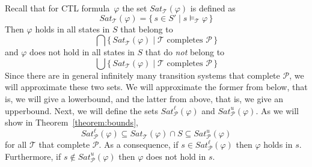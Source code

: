 \documentclass[12pt]{article}
\theoremstyle{definition}
\begin{document}
Recall that for CTL formula~$\varphi$ the set $\mathit{Sat}_{\mathcal{T}}(\varphi)$ is defined as
\[
\mathit{Sat}_{\mathcal{T}}(\varphi) = \{\, s \in S' \mid s \models_{\mathcal{T}} \varphi \,\}
\]
Then $\varphi$ holds in all states in $S$ that belong to
\[
\bigcap \{\, \mathit{Sat}_{\mathcal{T}}(\varphi) \mid \mathcal{T} \mbox{ completes } \mathcal{P} \,\}
\]
and $\varphi$ does not hold in all states in $S$ that do \emph{not} belong to
\[
\bigcup \{\, \mathit{Sat}_{\mathcal{T}}(\varphi) \mid \mathcal{T} \mbox{ completes } \mathcal{P} \,\}
\]
Since there are in general infinitely many transition systems that complete $\mathcal{P}$, we will approximate these two sets.  We will approximate the former from below, that is, we will give a lowerbound, and the latter from above, that is, we give an upperbound.  Next, we will define the sets $\mathit{Sat}^{\ell}_{\mathcal{P}}(\varphi)$  and  $\mathit{Sat}^{u}_{\mathcal{P}}(\varphi)$.  As we will show in Theorem~\ref{theorem:bounds},
\[
\mathit{Sat}^{\ell}_{\mathcal{P}}(\varphi)
\subseteq \mathit{Sat}_{\mathcal{T}}(\varphi) \cap S
\subseteq \mathit{Sat}^u_{\mathcal{P}}(\varphi)
\]
for all $\mathcal{T}$ that complete $\mathcal{P}$.  As a consequence, if $s \in \mathit{Sat}^{\ell}_{\mathcal{P}}(\varphi)$ then $\varphi$ holds in $s$.  Furthermore, if $s \not\in \mathit{Sat}^{u}_{\mathcal{P}}(\varphi)$ then $\varphi$ does not hold in $s$.
\end{document}

